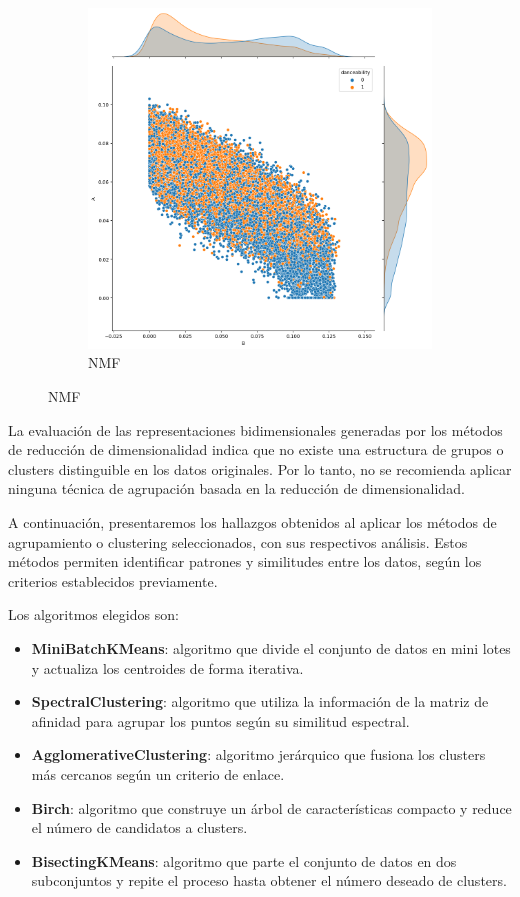 \documentclass{wsdcr}
\begin{document}
\begin{figure}[H]
    \hfill
    \begin{subfigure}[b]{0.3\columnwidth} \includegraphics[width=\columnwidth]{images/NMF.png} \caption{NMF} \label{fig:NMF} \end{subfigure}

\end{figure}

La evaluación de las representaciones bidimensionales generadas por los métodos de reducción de dimensionalidad indica que no existe una estructura de grupos o clusters distinguible en los datos originales. Por lo tanto, no se recomienda aplicar ninguna técnica de agrupación basada en la reducción de dimensionalidad.

A continuación, presentaremos los hallazgos obtenidos al aplicar los métodos de agrupamiento o  clustering seleccionados, con sus respectivos análisis. Estos métodos permiten identificar patrones y similitudes entre los datos, según los criterios establecidos previamente.

Los algoritmos elegidos son:
\begin{itemize}
    \setlength\itemsep{0em}
    \item \textbf{MiniBatchKMeans}: algoritmo que divide el conjunto de datos en mini lotes y actualiza los centroides de forma iterativa.
    \item \textbf{SpectralClustering}: algoritmo que utiliza la información de la matriz de afinidad para agrupar los puntos según su similitud espectral.
    \item \textbf{AgglomerativeClustering}: algoritmo jerárquico que fusiona los clusters más cercanos según un criterio de enlace.
    \item \textbf{Birch}: algoritmo que construye un árbol de características compacto y reduce el número de candidatos a clusters.
    \item \textbf{BisectingKMeans}: algoritmo que parte el conjunto de datos en dos subconjuntos y repite el proceso hasta obtener el número deseado de clusters.
\end{itemize}
\end{document}
